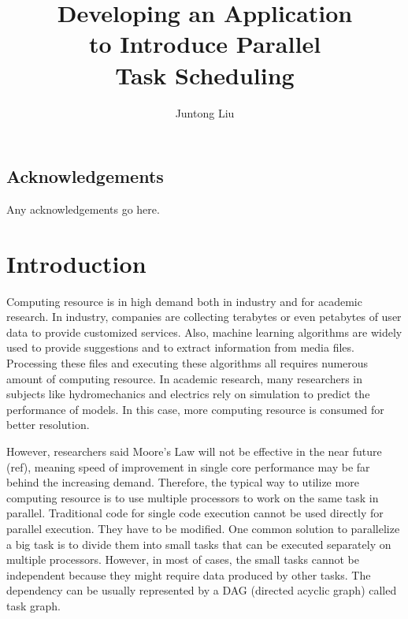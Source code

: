 \documentclass[msc,deptreport, cs]{infthesis}
\begin{document}
\begin{preliminary}

\title{Developing an Application \\to Introduce Parallel \\Task Scheduling}

\author{Juntong Liu}

\abstract{
}

\maketitle

\section*{Acknowledgements}
Any acknowledgements go here. 

\tableofcontents
\end{preliminary}


\chapter{Introduction}

Computing resource is in high demand both in industry and for academic research. In industry, companies are collecting terabytes or even petabytes of user data to provide customized services. Also, machine learning algorithms are widely used to provide suggestions and to extract information from media files. Processing these files and executing these algorithms all requires numerous amount of computing resource. In academic research, many researchers in subjects like hydromechanics and electrics rely on simulation to predict the performance of models. In this case, more computing resource is consumed for better resolution.

However, researchers said Moore's Law will not be effective in the near future (ref), meaning speed of improvement in single core performance may be far behind the increasing demand. Therefore, the typical way to utilize more computing resource is to use multiple processors to work on the same task in parallel. Traditional code for single code execution cannot be used directly for parallel execution. They have to be modified. One common solution to parallelize a big task is to divide them into small tasks that can be executed separately on multiple processors. However, in most of cases, the small tasks cannot be independent because they might require data produced by other tasks. The dependency can be usually represented by a DAG (directed acyclic graph) called task graph.
\end{document}
